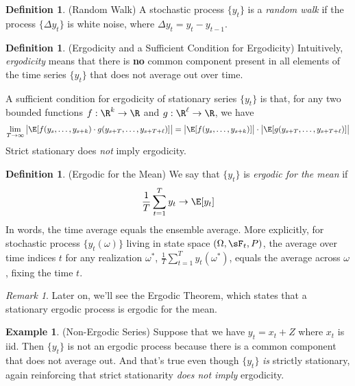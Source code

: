 \documentclass[12pt]{article}
\theoremstyle{plain}
\theoremstyle{definition}
\newtheorem{defn}[thm]{Definition}
\newtheorem{ex}[thm]{Example}
\theoremstyle{remark}
\newtheorem*{rmk}{Remark}
\newcommand{\ra}{\rightarrow}
\newcommand{\sumtT}{\sum^T_{t=1}}
\begin{document}
\begin{defn}(Random Walk)
A stochastic process $\{y_t\}$ is a \emph{random walk} if the process
$\{\Delta y_t\}$ is white noise, where $\Delta y_t = y_t-y_{t-1}$.
\end{defn}

\begin{defn}(Ergodicity and a Sufficient Condition for Ergodicity)
Intuitively, \emph{ergodicity} means that there is \textbf{no} common
component present in all elements of the time series $\{y_t\}$ that
does not average out over time.

A sufficient condition for ergodicity of stationary series $\{y_t\}$ is
that, for any two bounded functions $f:\R^k\ra \R$ and $g:\R^\ell\ra\R$,
we have
\begin{align*}
  \lim_{T\ra\infty}
  \big|
  \E[
    f(y_s,\ldots,y_{s+k})
    \cdot
    g(y_{s+T},\ldots,y_{s+T+\ell})
  ]
  \big|
  =
  \big|
  \E[
    f(y_s,\ldots,y_{s+k})
  ]\big|
    \cdot
  \big|
  \E[
  g(y_{s+T},\ldots,y_{s+T+\ell})]
  \big|
\end{align*}
Strict stationary does \emph{not} imply ergodicity.
\end{defn}

\begin{defn}(Ergodic for the Mean)
We say that $\{y_t\}$ is \emph{ergodic for the mean} if
\begin{align*}
  \frac{1}{T}\sum^T_{t=1}y_t \ra \E[y_t]
\end{align*}
In words, the time average equals the ensemble average. More explicitly,
for stochastic process $\{y_t(\omega)\}$ living in state space
$(\Omega,\sF_t,P)$, the average over time indices $t$ for any
realization $\omega^*$, $\frac{1}{T}\sumtT y_t(\omega^*)$, equals the
average across $\omega$, fixing the time $t$.
\end{defn}
\begin{rmk}
Later on, we'll see the Ergodic Theorem, which states that a stationary
ergodic process is ergodic for the mean.
\end{rmk}

\begin{ex}(Non-Ergodic Series)
Suppose that we have $y_t=x_t+Z$ where $x_t$ is iid. Then $\{y_t\}$ is
not an ergodic process because there is a common component that does not
average out. And that's true even though $\{y_t\}$ \emph{is} strictly
stationary, again reinforcing that strict stationarity
\emph{does not imply} ergodicity.
\end{ex}
\end{document}
